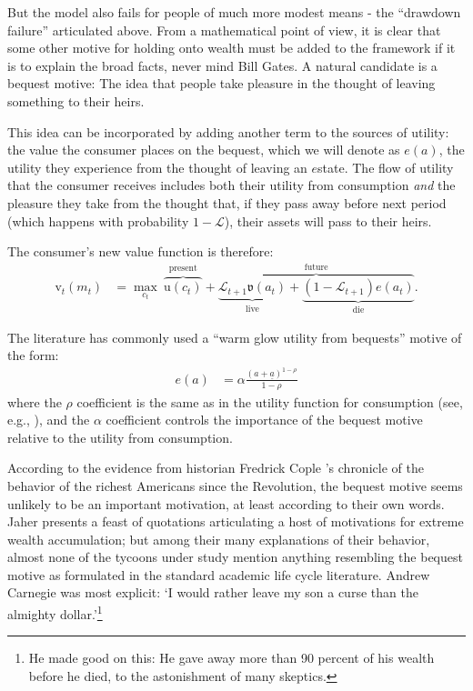 \documentclass{article}
\newcommand{\CRRA}{\rho}
\newcommand{\uFunc}{\mathrm{u}}
\newcommand{\vFunc}{\mathrm{v}}
\newcommand{\Alive}{\mathcal{L}}
\newcommand{\cNrm}{c}
\newcommand{\aNrm}{a}
\newcommand{\mNrm}{m}
\newcommand{\bqstNrm}{e}
\begin{document}
But the model also fails for people of much more modest means - the ``drawdown failure'' articulated above.
From a mathematical point of view, it is clear that some other motive for holding onto wealth must be added to the framework if it is to explain the broad facts, never mind Bill Gates.
A natural candidate is a bequest motive: The idea that people take pleasure in the thought of leaving something to their heirs.

This idea can be incorporated by adding another term to the sources of utility: the value the consumer places on the bequest, which we will denote as $\bqstNrm(\aNrm)$, the utility they experience from the thought of leaving an $\bqstNrm$state.
The flow of utility that the consumer receives includes both their utility from consumption \textit{and} the pleasure they take from the thought that, if they pass away before next period (which happens with probability $1 -\Alive$), their assets will pass to their heirs.

The consumer's new value function is therefore:
\begin{align}
    {\vFunc}_{t}({\mNrm}_{t}) & = \max_{\cNrm_{t}} ~ \overbrace{\uFunc(\cNrm_{t})}^{\text{present}}+\overbrace{\underbrace{\Alive_{t+1}\mathfrak{v}(\aNrm_{t})}_{\text{live}} + \underbrace{(1-\Alive_{t+1})\bqstNrm({\aNrm}_{t})}_{\text{die}}
    }^{\text{future}}.
\end{align}

The literature has commonly used a ``warm glow utility from bequests'' motive of the form:
\begin{align}
    \bqstNrm(a) & = \alpha\frac{(a+\underline{a})^{1-\CRRA}}{1-\CRRA}
\end{align}
where the $\CRRA$ coefficient is the same as in the utility function for consumption (see, e.g., \cite{deNardiBequest}), and the $\alpha$ coefficient controls the importance of the bequest motive relative to the utility from consumption.

According to the evidence from historian Fredrick Cople \cite{jaherGilded}'s chronicle of the behavior of the richest Americans since the Revolution, the bequest motive seems unlikely to be an important motivation, at least according to their own words.
Jaher presents a feast of quotations articulating a host of motivations for extreme wealth accumulation; but among their many explanations of their behavior, almost none of the tycoons under study mention anything resembling the bequest motive as formulated in the standard academic life cycle literature.
Andrew Carnegie was most explicit: `I would rather leave my son a curse than the almighty dollar.'\footnote{He made good on this: He gave away more than 90 percent of his wealth before he died, to the astonishment of many skeptics.}
\end{document}

